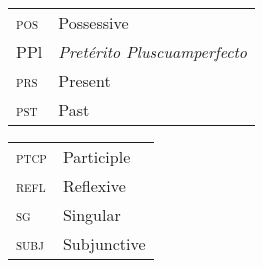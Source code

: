 \documentclass[output=paper]{langsci/langscibook}
\begin{document}
\begin{tabularx}{.44\textwidth}{lQ}
\textsc{pos} & Possessive\\
PPl & \emph{Pretérito Pluscuamperfecto}\\
\textsc{prs} & Present\\ 
\textsc{pst} & Past\\ 
\end{tabularx}%
\begin{tabularx}{.44\textwidth}{lQ}
\textsc{ptcp} & Participle\\ 
\textsc{refl} & Reflexive\\ 
\textsc{sg} & Singular\\ 
\textsc{subj} & Subjunctive\\ 
\end{tabularx}

\sloppy
\printbibliography[heading=subbibliography,notkeyword=this] 
\end{document}
